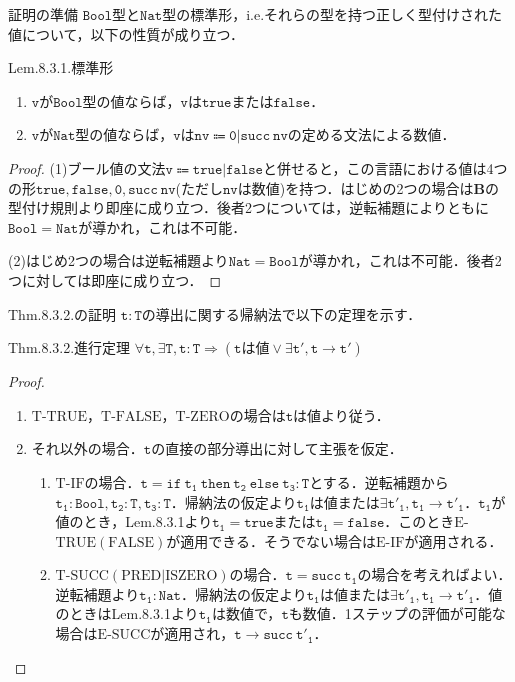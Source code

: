\documentclass[9pt]{beamer}
\begin{document}
\begin{frame}{証明の準備}
$\mathtt{Bool}$型と$\mathtt{Nat}$型の標準形，i.e.それらの型を持つ正しく型付けされた値について，以下の性質が成り立つ．
\begin{dblock}{Lem.8.3.1.標準形}
	\begin{enumerate}
		\item $\mathtt{v}$が$\mathtt{Bool}$型の値ならば，$\mathtt{v}$は$\mathtt{true}$または$\mathtt{false}$．
		\item $\mathtt{v}$が$\mathtt{Nat}$型の値ならば，$\mathtt{v}$は$\mathtt{nv\Coloneq 0|succ\ nv}$の定める文法による数値．
	\end{enumerate}
\end{dblock}
	\begin{proof}
	(1)ブール値の文法$\mathtt{v\Coloneq true|false}$と併せると，この言語における値は4つの形$\mathtt{true, false, 0, succ\ nv}$(ただし$\mathtt{nv}$は数値)を持つ．はじめの2つの場合は$\mathbf{B}$の型付け規則より即座に成り立つ．後者2つについては，逆転補題によりともに$\mathtt{Bool = Nat}$が導かれ，これは不可能．
	
	(2)はじめ2つの場合は逆転補題より$\mathtt{Nat = Bool}$が導かれ，これは不可能．後者2つに対しては即座に成り立つ．
	\end{proof}
\end{frame}
\begin{frame}{Thm.8.3.2.の証明}
	$\mathtt{t:T}$の導出に関する帰納法で以下の定理を示す．
	\begin{dblock}{Thm.8.3.2.進行定理}
		$\forall \mathtt{t},\exists\mathtt{T}, \mathtt{t:T}\Rightarrow (\mathtt{t}\text{は値}\lor\exists \mathtt{t'}, \mathtt{t\rightarrow t'})$
		\end{dblock}
\begin{proof}\begin{enumerate}
	\item$\mathrm{T}$-$\mathrm{TRUE}$，$\mathrm{T}$-$\mathrm{FALSE}$，$\mathrm{T}$-$\mathrm{ZERO}$の場合は$\mathtt{t}$は値より従う．
	\item それ以外の場合．$\mathtt{t}$の直接の部分導出に対して主張を仮定．\begin{enumerate}
		\item $\mathrm{T}$-$\mathrm{IF}$の場合．$\mathtt{t = if\ t_{1}\ then\ t_{2}\ else\ t_{3}:T}$とする．逆転補題から$\mathtt{t_{1}:Bool, t_{2}:T,t_{3}:T}$．帰納法の仮定より$\mathtt{t_{1}}$は値または$\exists \mathtt{t'_{1}, t_{1}\rightarrow t'_{1}}$．$\mathtt{t_{1}}$が値のとき，Lem.8.3.1より$\mathtt{t_{1} = true}$または$\mathtt{t_{1} = false}$．このとき$\mathrm{E}$-$\mathrm{TRUE(FALSE)}$が適用できる．そうでない場合は$\mathrm{E}$-$\mathrm{IF}$が適用される．
		\item $\mathrm{T}$-$\mathrm{SUCC(PRED|ISZERO)}$の場合．$\mathtt{t = succ\ t_{1}}$の場合を考えればよい．逆転補題より$\mathtt{t_{1}:Nat}$．帰納法の仮定より$\mathtt{t_{1}}$は値または$\exists \mathtt{t'_{1}, t_{1}\rightarrow t'_{1}}$．値のときはLem.8.3.1より$\mathtt{t_{1}}$は数値で，$\mathtt{t}$も数値．1ステップの評価が可能な場合は$\mathrm{E}$-$\mathrm{SUCC}$が適用され，$\mathtt{t\rightarrow succ\ t'_{1}}$．
	\end{enumerate}
\end{enumerate}
\end{proof}
\end{frame}
\end{document}
